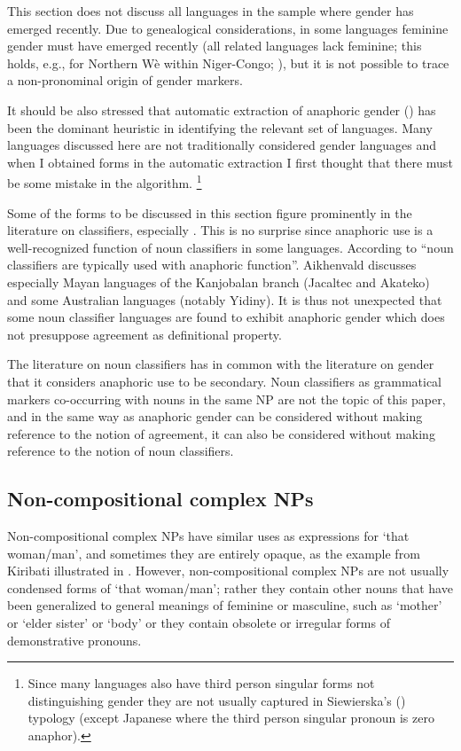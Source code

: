 \documentclass[output=collectionpaper]{langsci/langscibook}
\begin{document}
This section does not discuss all languages in the sample where gender has emerged recently. Due to genealogical considerations, in some languages feminine gender must have emerged recently (all related languages lack feminine; this holds, e.g., for Northern Wè within Niger-Congo; \citealt{Paradis1983}), but it is not possible to trace a non-pronominal origin of gender markers.

It should be also stressed that automatic extraction of anaphoric gender () has been the dominant heuristic in identifying the relevant set of languages. Many languages discussed here are not traditionally considered gender languages and when I obtained forms in the automatic extraction I first thought that there must be some mistake in the algorithm.%
\footnote{%
Since many languages also have third person singular forms not distinguishing gender they are not usually captured in Siewierska’s (\citealt*{Siewierska2005}) typology (except Japanese where the third person singular pronoun is zero anaphor).
}%

Some of the forms to be discussed in this section figure prominently in the literature on classifiers, especially . This is no surprise since anaphoric use is a well-recognized function of noun classifiers in some languages. According to \citet[87]{Aikhenvald2000} “noun classifiers are typically used with anaphoric function”. Aikhenvald discusses especially Mayan languages of the Kanjobalan branch (Jacaltec and Akateko) and some Australian languages (notably Yidiny). It is thus not unexpected that some noun classifier languages are found to exhibit anaphoric gender which does not presuppose agreement as definitional property.

The literature on noun classifiers has in common with the literature on gender that it considers anaphoric use to be secondary. Noun classifiers as grammatical markers co-occurring with nouns in the same NP are not the topic of this paper, and in the same way as anaphoric gender can be considered without making reference to the notion of agreement, it can also be considered without making reference to the notion of noun classifiers.


\subsection{Non-compositional complex NPs}
\label{sec:BW:5.2}

Non-compositional complex NPs have similar uses as expressions for ‘that woman\slash man’, and sometimes they are entirely opaque, as the example from Kiribati illustrated in . However, non-compositional complex NPs are not usually condensed forms of ‘that woman/man’; rather they contain other nouns that have been generalized to general meanings of feminine or masculine, such as ‘mother’ or ‘elder sister’ or ‘body’ or they contain obsolete or irregular forms of demonstrative pronouns.
\end{document}
